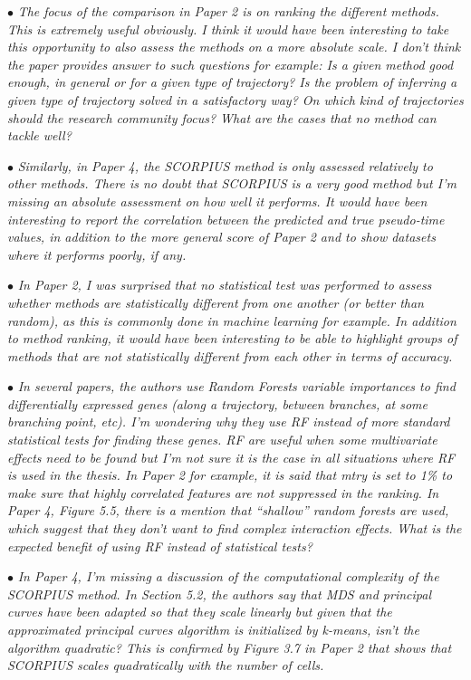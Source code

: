\documentclass[10pt]{article}
\newcommand{\exam}[2][\  ]{\hspace{0pt}\marginpar{\color{red}#1}$\bullet$ \textit{#2}}
\newcommand{\imp}[1]{{\color{red} #1}}
\newcommand{\bigexclaim}{\raisebox{-0.1em}{\BigTriangleUp}\hspace{-0.32em}\llap{\small\textbf{!}}\hspace{0.32em}}
\newcommand{\tagimp}{\bigexclaim}
\begin{document}
{\exam[\tagimp]{The focus of the comparison in Paper 2 is on ranking the different methods. This is extremely
	useful obviously. \imp{I think it would have been interesting to take this opportunity to also assess
	the methods on a more absolute scale.} I don’t think the paper provides answer to such
	questions for example: Is a given method good enough, in general or for a given type of
	trajectory? Is the problem of inferring a given type of trajectory solved in a satisfactory way?
	On which kind of trajectories should the research community focus? What are the cases that
	no method can tackle well?}

\exam{Similarly, in Paper 4, the SCORPIUS method is only assessed relatively to other methods.
	There is no doubt that SCORPIUS is a very good method but I’m missing an absolute
	assessment on how well it performs. It would have been interesting to report the correlation
	between the predicted and true pseudo-time values, in addition to the more general score of
	Paper 2 and to show datasets where it performs poorly, if any.}

\exam[\tagimp]{\imp{In Paper 2, I was surprised that no statistical test was performed to assess whether methods
	are statistically different from one another} (or better than random), as this is commonly done
	in machine learning for example. In addition to method ranking, it would have been
	interesting to be able to highlight groups of methods that are not statistically different from
	each other in terms of accuracy.}

\exam[\tagimp]{In several papers, the authors use Random Forests variable importances to find differentially
	expressed genes (along a trajectory, between branches, at some branching point, etc). \imp{I’m
	wondering why they use RF instead of more standard statistical tests for finding these genes.}
	RF are useful when some multivariate effects need to be found but I’m not sure it is the case
	in all situations where RF is used in the thesis. In Paper 2 for example, it is said that mtry is
	set to 1\% to make sure that highly correlated features are not suppressed in the ranking. In
	Paper 4, Figure 5.5, there is a mention that “shallow” random forests are used, which suggest
	that they don’t want to find complex interaction effects. What is the expected benefit of
	using RF instead of statistical tests?}

\exam[\tagimp]{In Paper 4, \imp{I’m missing a discussion of the computational complexity of the SCORPIUS
	method.} In Section 5.2, the authors say that MDS and principal curves have been adapted so
	that they scale linearly but given that the approximated principal curves algorithm is
	initialized by k-means, isn’t the algorithm quadratic? This is confirmed by Figure 3.7 in
	Paper 2 that shows that SCORPIUS scales quadratically with the number of cells.}

}
\end{document}
